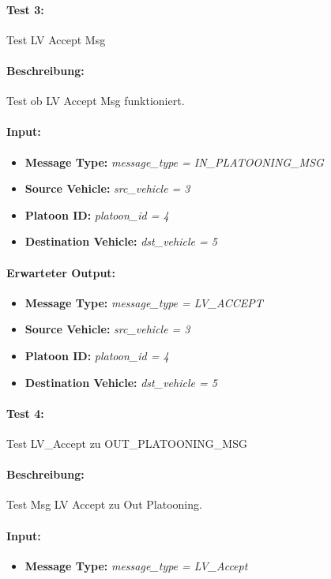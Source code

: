 \documentclass[a4paper, 12pt, titlepage]{scrartcl}
\begin{document}
{			\paragraph{Test 3:}{Test LV Accept Msg}
			\paragraph{Beschreibung:} Test ob LV Accept Msg funktioniert.
			\paragraph{Input:}
			\begin{itemize} \itemsep-0.5em
				\item \textbf{Message Type:} \emph{message\_type = IN\_PLATOONING\_MSG}
				\item \textbf{Source Vehicle:} \emph{src\_vehicle = 3}
				\item \textbf{Platoon ID:} \emph{platoon\_id = 4}
				\item \textbf{Destination Vehicle:} \emph{dst\_vehicle = 5}
			\end{itemize}
			\paragraph{Erwarteter Output:}
			\begin{itemize} \itemsep-0.5em
				\item \textbf{Message Type:} \emph{message\_type = LV\_ACCEPT}
				\item \textbf{Source Vehicle:} \emph{src\_vehicle = 3}
				\item \textbf{Platoon ID:} \emph{platoon\_id = 4}
				\item \textbf{Destination Vehicle:} \emph{dst\_vehicle = 5}
			\end{itemize}	
			
			\paragraph{Test 4:}{Test LV\_Accept zu OUT\_PLATOONING\_MSG}
			\paragraph{Beschreibung:} Test Msg LV Accept zu Out Platooning.
			\paragraph{Input:}
			\begin{itemize} \itemsep-0.5em
				\item \textbf{Message Type:} \emph{message\_type = LV\_Accept}


\end{itemize}}
\end{document}
